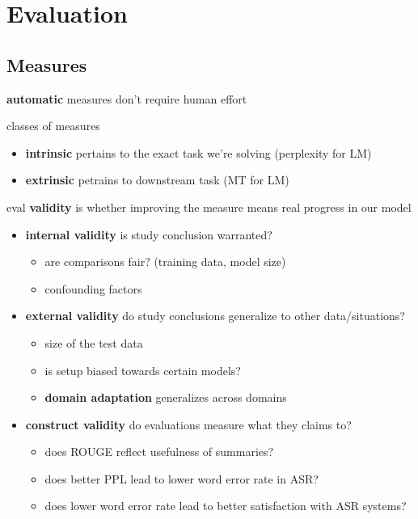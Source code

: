 \documentclass[]{article}
\theoremstyle{definition}
\begin{document}
\section{Evaluation}%
\label{sec:evaluation}

\subsection{Measures}%
\label{sub:measures}
\textbf{automatic} measures don't require human effort


classes of measures
\begin{itemize}
    \item \textbf{intrinsic} pertains to the exact task we're solving (perplexity for LM)
    \item \textbf{extrinsic} petrains to downstream task (MT for LM)
\end{itemize}


eval \textbf{validity} is whether improving the measure means real progress in our model
\begin{itemize}
    \item \textbf{internal validity} is study conclusion warranted?
        \begin{itemize}
            \item are comparisons fair? (training data, model size)
            \item confounding factors
        \end{itemize}
    \item \textbf{external validity} do study conclusions generalize to other data/situations?
        \begin{itemize}
            \item size of the test data
            \item is setup biased towards certain models?
            \item \textbf{domain adaptation} generalizes across domains
        \end{itemize}
    \item \textbf{construct validity} do evaluations measure what they claims to?
        \begin{itemize}
            \item does ROUGE reflect usefulness of summaries?
            \item does better PPL lead to lower word error rate in ASR?
            \item does lower word error rate lead to better satisfaction with ASR systems?
        \end{itemize}
\end{itemize}
\end{document}
